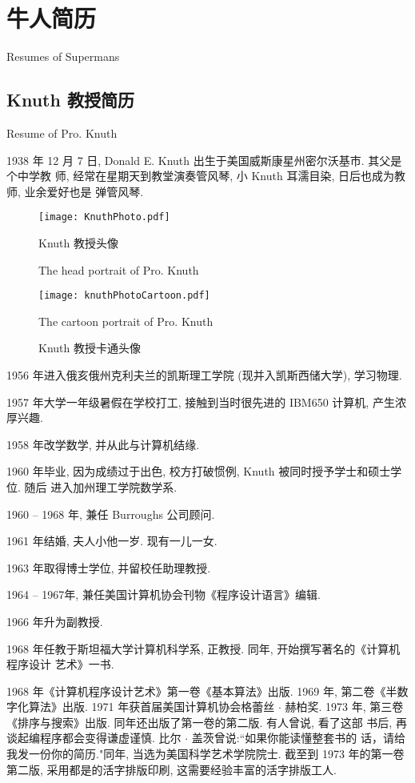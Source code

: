 \chapter{牛人简历}{Resumes of Supermans}
\label{cha:ResumesOfSupermans}
\section{Knuth 教授简历}{Resume of Pro. Knuth}

1938 年 12 月 7 日, Donald E. Knuth 出生于美国威斯康星州密尔沃基市. 其父是个中学教
师, 经常在星期天到教堂演奏管风琴, 小 Knuth 耳濡目染, 日后也成为教师, 业余爱好也是
弹管风琴.

\begin{figure}
  \centering
  \begin{minipage}[t]{0.3\textwidth}
    \centering
    \texttt{[image: KnuthPhoto.pdf]}
    \caption{Knuth 教授头像}{The head portrait of Pro. Knuth}
  \end{minipage}
  \hspace{1cm}
  \begin{minipage}[t]{0.3\textwidth}
    \centering
    \texttt{[image: knuthPhotoCartoon.pdf]}
    \caption{Knuth 教授卡通头像}{The cartoon portrait of Pro. Knuth}
  \end{minipage}
\end{figure}


1956 年进入俄亥俄州克利夫兰的凯斯理工学院 (现并入凯斯西储大学), 学习物理.

1957 年大学一年级暑假在学校打工, 接触到当时很先进的 IBM650 计算机, 产生浓厚兴趣.

1958 年改学数学, 并从此与计算机结缘.

1960 年毕业, 因为成绩过于出色, 校方打破惯例, Knuth 被同时授予学士和硕士学位. 随后
进入加州理工学院数学系.

1960 -- 1968 年, 兼任 Burroughs 公司顾问.

1961 年结婚, 夫人小他一岁. 现有一儿一女.

1963 年取得博士学位, 并留校任助理教授.

1964 -- 1967年, 兼任美国计算机协会刊物《程序设计语言》编辑.

1966 年升为副教授.

1968 年任教于斯坦福大学计算机科学系, 正教授. 同年, 开始撰写著名的《计算机程序设计
艺术》一书.

1968 年《计算机程序设计艺术》第一卷《基本算法》出版.
1969 年, 第二卷《半数字化算法》出版.
1971 年获首届美国计算机协会格蕾丝 $\cdot$ 赫柏奖.
1973 年, 第三卷《排序与搜索》出版. 同年还出版了第一卷的第二版. 有人曾说, 看了这部
书后, 再谈起编程序都会变得谦虚谨慎. 比尔 $\cdot$ 盖茨曾说:``如果你能读懂整套书的
话，请给我发一份你的简历."同年, 当选为美国科学艺术学院院士. 截至到 1973 年的第一卷
第二版, 采用都是的活字排版印刷, 这需要经验丰富的活字排版工人.

